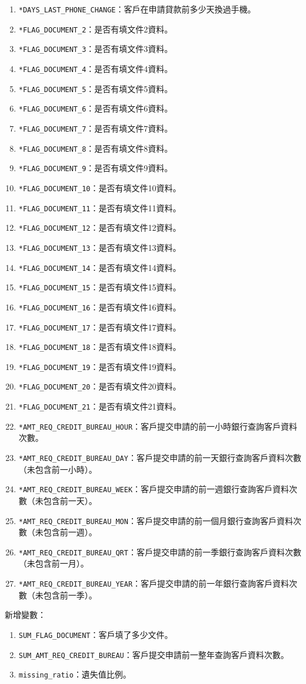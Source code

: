 \documentclass[12pt, a4paper]{article}
\begin{document}
\begin{enumerate}
\item \verb|*DAYS_LAST_PHONE_CHANGE|：客戶在申請貸款前多少天換過手機。
\item \verb|*FLAG_DOCUMENT_2|：是否有填文件2資料。
\item \verb|*FLAG_DOCUMENT_3|：是否有填文件3資料。
\item \verb|*FLAG_DOCUMENT_4|：是否有填文件4資料。
\item \verb|*FLAG_DOCUMENT_5|：是否有填文件5資料。
\item \verb|*FLAG_DOCUMENT_6|：是否有填文件6資料。
\item \verb|*FLAG_DOCUMENT_7|：是否有填文件7資料。
\item \verb|*FLAG_DOCUMENT_8|：是否有填文件8資料。
\item \verb|*FLAG_DOCUMENT_9|：是否有填文件9資料。
\item \verb|*FLAG_DOCUMENT_10|：是否有填文件10資料。
\item \verb|*FLAG_DOCUMENT_11|：是否有填文件11資料。
\item \verb|*FLAG_DOCUMENT_12|：是否有填文件12資料。
\item \verb|*FLAG_DOCUMENT_13|：是否有填文件13資料。
\item \verb|*FLAG_DOCUMENT_14|：是否有填文件14資料。
\item \verb|*FLAG_DOCUMENT_15|：是否有填文件15資料。
\item \verb|*FLAG_DOCUMENT_16|：是否有填文件16資料。
\item \verb|*FLAG_DOCUMENT_17|：是否有填文件17資料。
\item \verb|*FLAG_DOCUMENT_18|：是否有填文件18資料。
\item \verb|*FLAG_DOCUMENT_19|：是否有填文件19資料。
\item \verb|*FLAG_DOCUMENT_20|：是否有填文件20資料。
\item \verb|*FLAG_DOCUMENT_21|：是否有填文件21資料。
\item \verb|*AMT_REQ_CREDIT_BUREAU_HOUR|：客戶提交申請的前一小時銀行查詢客戶資料次數。
\item \verb|*AMT_REQ_CREDIT_BUREAU_DAY|：客戶提交申請的前一天銀行查詢客戶資料次數（未包含前一小時）。
\item \verb|*AMT_REQ_CREDIT_BUREAU_WEEK|：客戶提交申請的前一週銀行查詢客戶資料次數（未包含前一天）。
\item \verb|*AMT_REQ_CREDIT_BUREAU_MON|：客戶提交申請的前一個月銀行查詢客戶資料次數（未包含前一週）。
\item \verb|*AMT_REQ_CREDIT_BUREAU_QRT|：客戶提交申請的前一季銀行查詢客戶資料次數（未包含前一月）。
\item \verb|*AMT_REQ_CREDIT_BUREAU_YEAR|：客戶提交申請的前一年銀行查詢客戶資料次數（未包含前一季）。
\end{enumerate}
新增變數：
\begin{enumerate}
\item \verb|SUM_FLAG_DOCUMENT|：客戶填了多少文件。
\item \verb|SUM_AMT_REQ_CREDIT_BUREAU|：客戶提交申請前一整年查詢客戶資料次數。
\item \verb|missing_ratio|：遺失值比例。
\end{enumerate}
\end{document}
